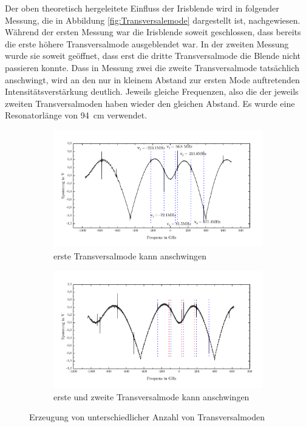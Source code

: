 \documentclass[a4paper,twoside,final]{article}
\begin{document}
\FloatBarrier

Der oben theoretisch hergeleitete Einfluss der Irisblende wird in folgender Messung, die in Abbildung \ref{fig:Transversalemode} dargestellt ist, nachgewiesen. Während der ersten Messung war die Irisblende soweit geschlossen, dass bereits die erste höhere Transversalmode ausgeblendet war. In der zweiten Messung wurde sie soweit geöffnet, dass erst die dritte Transversalmode die Blende nicht passieren konnte. Dass in Messung zwei die zweite Transversalmode tatsächlich anschwingt, wird an den nur in kleinem Abstand zur ersten Mode auftretenden Intensitätsverstärkung deutlich. Jeweils gleiche Frequenzen, also die der jeweils zweiten Transversalmoden haben wieder den gleichen Abstand. Es wurde eine Resonatorlänge von \SI{94}{\centi\meter} verwendet.

\begin{figure}[htp]
  \centering
  \begin{subfigure}{0.8\textwidth}
    \includegraphics[width=\textwidth]{Bilder/1TransversaleMode_94cm.pdf}
    \caption{erste Transversalmode kann anschwingen}
  \end{subfigure}
  \begin{subfigure}{0.8\textwidth}
    \includegraphics[width=\textwidth]{Bilder/2TransversaleModen_94cm.pdf}
    \caption{erste und zweite Transversalmode kann anschwingen}
  \end{subfigure}
  \caption{Erzeugung von unterschiedlicher Anzahl von Transversalmoden}
  \label{fig:Transversalmoden}
\end{figure}
\FloatBarrier
\end{document}
